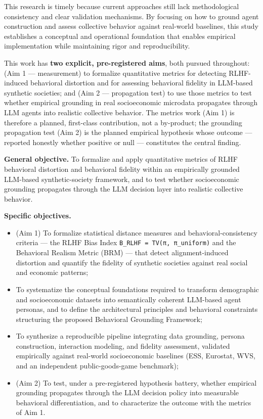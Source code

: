 This research is timely because current approaches still lack methodological consistency and clear validation mechanisms. By focusing on how to ground agent construction and assess collective behavior against real-world baselines, this study establishes a conceptual and operational foundation that enables empirical implementation while maintaining rigor and reproducibility.


This work has \textbf{two explicit, pre-registered aims}, both pursued throughout: (Aim 1 — measurement) to formalize quantitative metrics for detecting RLHF-induced behavioral distortion and for assessing behavioral fidelity in LLM-based synthetic societies; and (Aim 2 — propagation test) to use those metrics to test whether empirical grounding in real socioeconomic microdata propagates through LLM agents into realistic collective behavior. The metrics work (Aim 1) is therefore a planned, first-class contribution, not a by-product; the grounding propagation test (Aim 2) is the planned empirical hypothesis whose outcome — reported honestly whether positive or null — constitutes the central finding.

\textbf{General objective.} To formalize and apply quantitative metrics of RLHF behavioral distortion and behavioral fidelity within an empirically grounded LLM-based synthetic-society framework, and to test whether socioeconomic grounding propagates through the LLM decision layer into realistic collective behavior.

\textbf{Specific objectives.}

\begin{itemize}
\item (Aim 1) To formalize statistical distance measures and behavioral-consistency criteria — the RLHF Bias Index \texttt{B\_RLHF = TV(π, π\_uniform)} and the Behavioral Realism Metric (BRM) — that detect alignment-induced distortion and quantify the fidelity of synthetic societies against real social and economic patterns;
\item To systematize the conceptual foundations required to transform demographic and socioeconomic datasets into semantically coherent LLM-based agent personas, and to define the architectural principles and behavioral constraints structuring the proposed Behavioral Grounding Framework;
\item To synthesize a reproducible pipeline integrating data grounding, persona construction, interaction modeling, and fidelity assessment, validated empirically against real-world socioeconomic baselines (ESS, Eurostat, WVS, and an independent public-goods-game benchmark);
\item (Aim 2) To test, under a pre-registered hypothesis battery, whether empirical grounding propagates through the LLM decision policy into measurable behavioral differentiation, and to characterize the outcome with the metrics of Aim 1.
\end{itemize}

